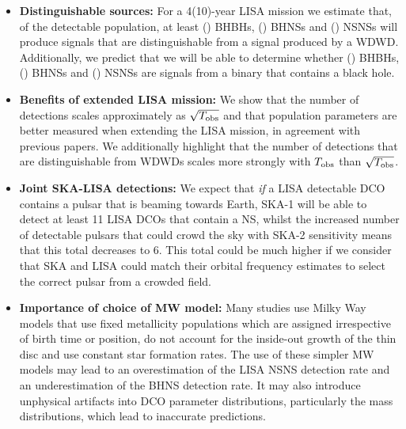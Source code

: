 \begin{itemize}
    \item \textbf{Distinguishable sources:} For a 4(10)-year LISA mission we estimate that, of the detectable population, at least \BHBHNotWDWDFour{}(\BHBHNotWDWDTen{}) BHBHs, \BHNSNotWDWDFour{}(\BHNSNotWDWDTen{}) BHNSs and \NSNSNotWDWDFour{}(\NSNSNotWDWDTen{}) NSNSs will produce signals that are distinguishable from a signal produced by a WDWD. Additionally, we predict that we will be able to determine whether \BHBHEitherBHOrNSFour{}(\BHBHEitherBHOrNSTen{}) BHBHs, \BHNSEitherBHOrNSFour{}(\BHNSEitherBHOrNSTen{}) BHNSs and \NSNSEitherBHOrNSFour{}(\NSNSEitherBHOrNSTen{}) NSNSs are signals from a binary that contains a black hole.
    \item \textbf{Benefits of extended LISA mission:} We show that the number of detections scales approximately as $\sqrt{T_{\rm obs}}$ and that population parameters are better measured when extending the LISA mission, in agreement with previous papers. We additionally highlight that the number of detections that are distinguishable from WDWDs scales more strongly with $T_{\rm obs}$ than $\sqrt{T_{\rm obs}}$.
    \item \textbf{Joint SKA-LISA detections:} We expect that \textit{if} a LISA detectable DCO contains a pulsar that is beaming towards Earth, SKA-1 will be able to detect at least 11 LISA DCOs that contain a NS, whilst the increased number of detectable pulsars that could crowd the sky with SKA-2 sensitivity means that this total decreases to 6. This total could be much higher if we consider that SKA and LISA could match their orbital frequency estimates to select the correct pulsar from a crowded field.
    \item \textbf{Importance of choice of MW model:} Many studies use Milky Way models that use fixed metallicity populations which are assigned irrespective of birth time or position, do not account for the inside-out growth of the thin disc and use constant star formation rates. The use of these simpler MW models may lead to an overestimation of the LISA NSNS detection rate and an underestimation of the BHNS detection rate. It may also introduce unphysical artifacts into DCO parameter distributions, particularly the mass distributions, which lead to inaccurate predictions.
\end{itemize}